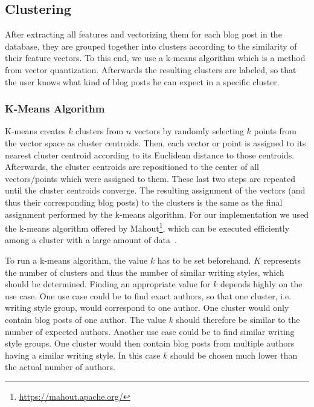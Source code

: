 
\subsection{Clustering}
\label{sec:clustering}

After extracting all features and vectorizing them for each blog post in the database, they are grouped together into clusters according to the similarity of their feature vectors.
To this end, we use a k-means algorithm which is a method from vector quantization.
Afterwards the resulting clusters are labeled, so that the user knows what kind of blog posts he can expect in a specific cluster.

\subsubsection{K-Means Algorithm}
\label{sec:k-means}
K-means creates $k$ clusters from $n$ vectors by randomly selecting $k$ points from the vector space as cluster centroids.
Then, each vector or point is assigned to its nearest cluster centroid according to its Euclidean distance to those centroids.
Afterwards, the cluster centroids are repositioned to the center of all vectors/points which were assigned to them.
These last two steps are repeated until the cluster centroids converge.
The resulting assignment of the vectors (and thus their corresponding blog posts) to the clusters is the same as the final assignment performed by the k-means algorithm.
For our implementation we used the k-means algorithm offered by Mahout\footnote{\url{https://mahout.apache.org/}}, which can be executed efficiently among a cluster with a large amount of data~\cite{esteves2011k}.

To run a k-means algorithm, the value $k$ has to be set beforehand.
$K$ represents the number of clusters and thus the number of similar writing styles, which should be determined.
Finding an appropriate value for $k$ depends highly on the use case.
One use case could be to find exact authors, so that one cluster, i.e. writing style group, would correspond to one author.
One cluster would only contain blog posts of one author.
The value $k$ should therefore be similar to the number of expected authors.
Another use case could be to find similar writing style groups.
One cluster would then contain blog posts from multiple authors having a similar writing style.
In this case $k$ should be chosen much lower than the actual number of authors.


